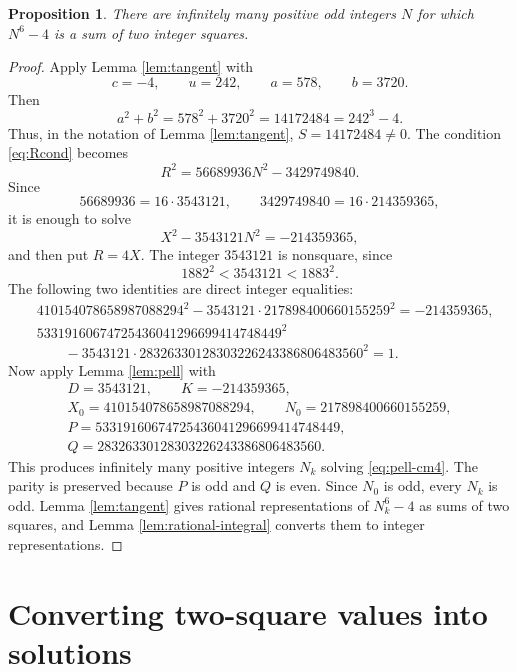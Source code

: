 \documentclass{article}
\theoremstyle{plain}
\newtheorem{proposition}{Proposition}[section]
\theoremstyle{remark}
\theoremstyle{myconjecture}
\theoremstyle{plain}
\theoremstyle{definition}
\numberwithin{equation}{section} %
\begin{document}
\begin{proposition}\label{prop:cm4}
There are infinitely many positive odd integers \(N\) for which \(N^6-4\) is a
sum of two integer squares.
\end{proposition}

\begin{proof}
Apply Lemma \ref{lem:tangent} with
\[
        c=-4,
        \qquad u=242,
        \qquad a=578,
        \qquad b=3720.
\]
Then
\[
        a^2+b^2=578^2+3720^2=14172484=242^3-4.
\]
Thus, in the notation of Lemma \ref{lem:tangent},
\(S=14172484\ne0\).  The condition \eqref{eq:Rcond} becomes
\[
        R^2=56689936N^2-3429749840.
\]
Since
\[
        56689936=16\cdot3543121,
        \qquad
        3429749840=16\cdot214359365,
\]
it is enough to solve
\[
        X^2-3543121N^2=-214359365,          \tag{7}\label{eq:pell-cm4}
\]
and then put \(R=4X\).  The integer \(3543121\) is nonsquare, since
\[
        1882^2<3543121<1883^2.
\]
The following two identities are direct integer equalities:
\[
\begin{aligned}
&410154078658987088294^2
 -3543121\cdot217898400660155259^2=-214359365, \\
&53319160674725436041296699414748449^2 \\
&\qquad
 -3543121\cdot28326330128303226243386806483560^2=1.
\end{aligned}
\]
Now apply Lemma \ref{lem:pell} with
\[
\begin{gathered}
        D=3543121,\qquad K=-214359365, \\
        X_0=410154078658987088294,\qquad
        N_0=217898400660155259, \\
        P=53319160674725436041296699414748449, \\
        Q=28326330128303226243386806483560.
\end{gathered}
\]
This produces infinitely many positive integers \(N_k\) solving
\eqref{eq:pell-cm4}.  The parity is preserved because \(P\) is odd and \(Q\) is
even.  Since \(N_0\) is odd, every \(N_k\) is odd.  Lemma \ref{lem:tangent}
gives rational representations of \(N_k^6-4\) as sums of two squares, and Lemma
\ref{lem:rational-integral} converts them to integer representations.
\end{proof}

\section{Converting two-square values into solutions}
\end{document}
